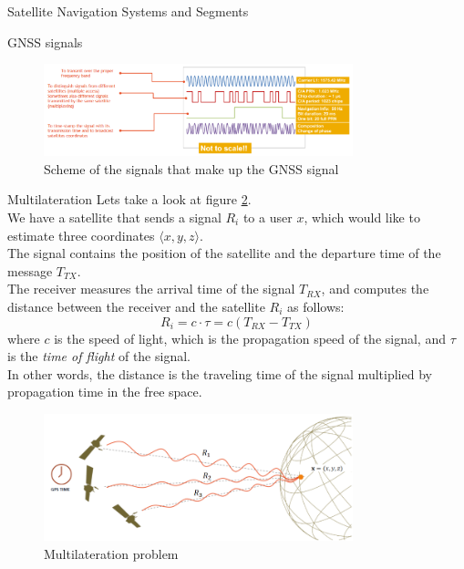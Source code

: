 \begin{section}{Satellite Navigation Systems and Segments}
\begin{subsection}{GNSS signals}
      \begin{figure}[h]
        \centering
        \includegraphics[width=0.8\textwidth]{img/wireless/GNSS signal scheme.png}
        \caption{Scheme of the signals that make up the GNSS signal}
        \label{fig:GNSS signals}
      \end{figure}
    \end{subsection}

  \end{section}
  \begin{section}{Multilateration}
    Lets take a look at figure \ref{fig:GNSS multilateration problem}.\\
    We have a satellite that sends a signal $R_i$ to a user $x$, which would like to estimate 
    three coordinates $\langle x, y, z \rangle$.\\
    The signal contains the position of the satellite and the departure time of the message
    $T_{TX}$.\\
    The receiver measures the arrival time of the signal $T_{RX}$, and computes the distance
    between the receiver and the satellite $R_i$ as follows:
    \begin{equation}
      R_i = c\cdot \tau = c(T_{RX} - T_{TX})
      \label{eq:GNSS distance}
    \end{equation}
    where $c$ is the speed of light, which is the propagation speed of the signal, and $\tau$ is the
    \textit{time of flight} of the signal.\\
    In other words, the distance is the traveling time of the signal multiplied by propagation time
    in the free space.\\

    \begin{figure}[h]
      \centering
      \includegraphics[width=0.8\textwidth]{img/wireless/GNSS multilateration problem.png}
      \caption{Multilateration problem}
      \label{fig:GNSS multilateration problem}
    \end{figure}


\end{section}
